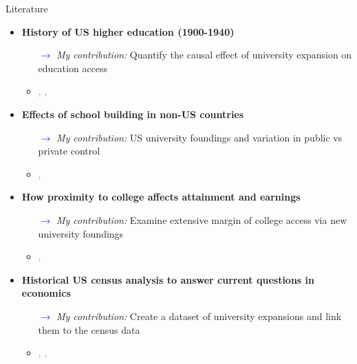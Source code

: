 \documentclass[notes,11pt, aspectratio=169]{beamer}
\begin{document}
\begin{frame}{Literature}
  \begin{itemize}
    \item \textbf{History of US higher education (1900-1940)}
    \begin{itemize}
      \item[\textcolor{blue}{$\rightarrow$}] \textit{My contribution:} Quantify the causal effect of university expansion on education access
      \item \textcolor{gray}{\cite{goldinAmericasGraduationHigh1998}, \cite{goldinOriginsStateLevelDifferences1998}, \cite{goldinHumanCapitalCenturyAmerican2001}}
    \end{itemize}

    \item \textbf{Effects of school building in non-US countries}
    \begin{itemize}
      \item[\textcolor{blue}{$\rightarrow$}] \textit{My contribution:} US university foundings and variation in public vs private control
      \item \textcolor{gray}{\cite{dufloSchoolingLaborMarket2001}, \cite{nimier-davidLocalHumanCapital2023}}
    \end{itemize}

    \item \textbf{How proximity to college affects attainment and earnings}
    \begin{itemize}
      \item[\textcolor{blue}{$\rightarrow$}] \textit{My contribution:} Examine extensive margin of college access via new university foundings
      \item \textcolor{gray}{\cite{cardUsingGeographicVariation1993}, \cite{actonDistanceDegreesHow2025}}
    \end{itemize}

    \item \textbf{Historical US census analysis to answer current questions in economics}
    \begin{itemize}
      \item[\textcolor{blue}{$\rightarrow$}] \textit{My contribution:} Create a dataset of university expansions and link them to the census data
      \item \textcolor{gray}{\cite{abramitzkyNationImmigrantsAssimilation2014}, \cite{derenoncourtCanYouMove2022}, \cite{bleemerChangesCollegeMobility2025}}
    \end{itemize}
  \end{itemize}
\end{frame}
\end{document}
